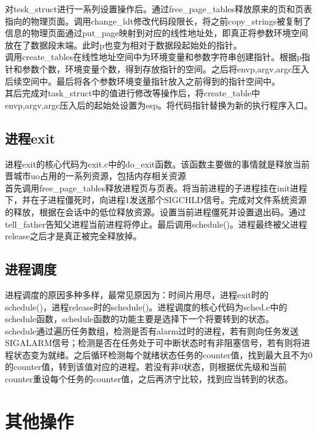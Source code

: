 \documentclass[]{report}
\begin{document}
对tesk\_struct进行一系列设置操作后。通过free\_page\_tables释放原来的页和页表指向的物理页面。调用change\_ldt修改代码段限长，将之前copy\_strings被复制了信息的物理页面通过put\_page映射到对应的线性地址处，即真正将参数环境空间放在了数据段末端。此时p也变为相对于数据段起始处的指针。\\

调用create\_tables在线性地址空间中为环境变量和参数字符串创建指针。根据p指针和参数个数，环境变量个数，得到存放指针的空间。之后将envp,argv,argc压入后续空间中。最后将各个参数环境变量指针放入之前得到的指针空间中。\\

其后完成对task\_struct中的值进行修改等操作后，将create\_table中envp,argv,argc压入后的起始处设置为esp。将代码指针替换为新的执行程序入口。

\subsection{进程exit}
进程exit的核心代码为exit.c中的do\_exit函数。该函数主要做的事情就是释放当前晋城市uo占用的一系列资源，包括内存相关资源\\

首先调用free\_page\_tables释放进程页与页表。将当前进程的子进程挂在init进程下，并在子进程僵死时，向进程1发送那个SIGCHLD信号。完成对文件系统资源的释放，根据在会话中的低位释放资源。设置当前进程僵死并设置退出码。通过tell\_father告知父进程当前进程将停止。最后调用schedule()。进程最终被父进程release之后才是真正被完全释放掉。

\subsection{进程调度}
进程调度的原因多种多样，最常见原因为：时间片用尽，进程exit时的schedule()，进程release时的schedule()。进程调度的核心代码为sched.c中的schedule函数，schedule函数的功能主要是选择下一个将要转到的状态。\\

schedule通过遍历任务数组，检测是否有alarm过时的进程，若有则向任务发送SIGALARM信号；检测是否在任务处于可中断状态时有非阻塞信号，若有则将进程状态变为就绪。之后循环检测每个就绪状态任务的counter值，找到最大且不为0的counter值，转到该值对应的进程。若没有非0状态，则根据优先级和当前counter重设每个任务的counter值，之后再济宁比较，找到应当转到的状态。

\section{其他操作}
\end{document}
